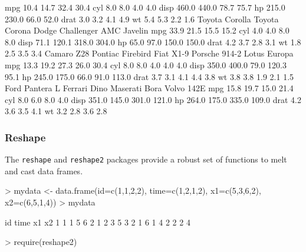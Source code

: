 \documentclass[10pt,slidestop,mathserif,c]{beamer}
\begin{document}
\begin{frame}
\begin{Schunk}
\begin{Soutput}
mpg                 10.4              14.7     32.4        30.4
cyl                  8.0               8.0      4.0         4.0
disp               460.0             440.0     78.7        75.7
hp                 215.0             230.0     66.0        52.0
drat                 3.0               3.2      4.1         4.9
wt                   5.4               5.3      2.2         1.6
     Toyota Corolla Toyota Corona Dodge Challenger AMC Javelin
mpg            33.9          21.5             15.5        15.2
cyl             4.0           4.0              8.0         8.0
disp           71.1         120.1            318.0       304.0
hp             65.0          97.0            150.0       150.0
drat            4.2           3.7              2.8         3.1
wt              1.8           2.5              3.5         3.4
     Camaro Z28 Pontiac Firebird Fiat X1-9 Porsche 914-2 Lotus Europa
mpg        13.3             19.2      27.3          26.0         30.4
cyl         8.0              8.0       4.0           4.0          4.0
disp      350.0            400.0      79.0         120.3         95.1
hp        245.0            175.0      66.0          91.0        113.0
drat        3.7              3.1       4.1           4.4          3.8
wt          3.8              3.8       1.9           2.1          1.5
     Ford Pantera L Ferrari Dino Maserati Bora Volvo 142E
mpg            15.8         19.7          15.0       21.4
cyl             8.0          6.0           8.0        4.0
disp          351.0        145.0         301.0      121.0
hp            264.0        175.0         335.0      109.0
drat            4.2          3.6           3.5        4.1
wt              3.2          2.8           3.6        2.8
\end{Soutput}
\end{Schunk}

\end{frame}

\begin{frame}
	\frametitle{Reshape}
	The \texttt{reshape} and \texttt{reshape2} packages provide a robust set of functions to melt and cast data frames.
	
\begin{Schunk}
\begin{Sinput}
> mydata <- data.frame(id=c(1,1,2,2), time=c(1,2,1,2), x1=c(5,3,6,2), x2=c(6,5,1,4))
> mydata
\end{Sinput}
\begin{Soutput}
  id time x1 x2
1  1    1  5  6
2  1    2  3  5
3  2    1  6  1
4  2    2  2  4
\end{Soutput}
\begin{Sinput}
> require(reshape2)
\end{Sinput}
\end{Schunk}

\end{frame}
\end{document}
